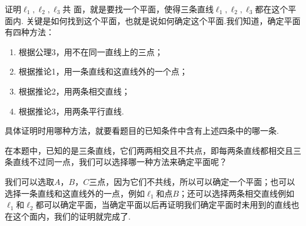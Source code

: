 \begin{analyze}
    证明$\ell_1,\ell_2,\ell_3$共
面，就是要找一个平面，使得三条直线$\ell_1,\ell_2,\ell_3$都在这个平面内. 关键是如何找到这个平面，也就是说如何确定这个平面.我们知道，确定平面有四种方法：

\noindent
\begin{minipage}{.53\textwidth}\CTEXindent
\begin{enumerate}
    \item 根据公理3，用不在同一直线上的三点；
    \item 根据推论1，用一条直线和这直线外的一个点；
    \item 根据推论2，用两条相交直线；
    \item 根据推论3，用两条平行直线.
\end{enumerate}
\end{minipage}
\hfill
\begin{minipage}{.45\textwidth}
\centering
{}
\end{minipage}


具体证明时用哪种方法，就要看题目的已知条件中含有上述四条中的哪一条.

在本题中，已知的是三条直线，它们两两相交且不共点，即每两条直线都相交且三条直线不过同一点，我们可以选择哪一种方法来确定平面呢？

我们可以选取$A$，$B$，$C$三点，因为它们不共线，所以可以确定一个平面；也可以选择一条直线和这直线外的一点，例如$\ell_1$和点$B$；还可以选择两条相交直线例如$\ell_1$和$\ell_2$都可以确定平面，当确定平面以后再证明我们确定平面时未用到的直线也在这个面内，我们的证明就完成了.
\end{analyze}

